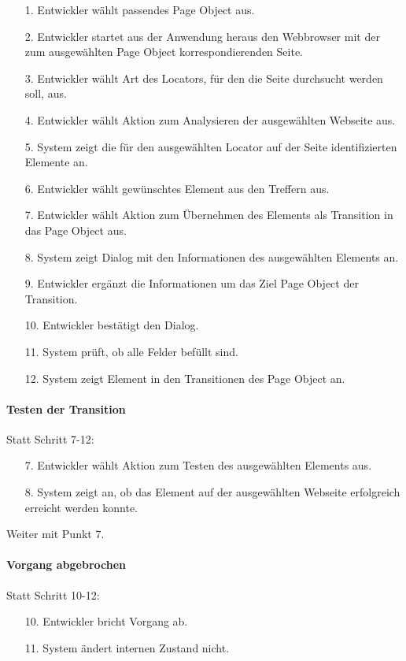\begin{itemize}[itemsep=0pt]
\item[1.] Entwickler wählt passendes Page Object aus.
\item[2.] Entwickler startet aus der Anwendung heraus den Webbrowser mit der zum ausgewählten Page Object korrespondierenden Seite. 
\item[3.] Entwickler wählt Art des Locators, für den die Seite durchsucht werden soll, aus.
\item[4.] Entwickler wählt Aktion zum Analysieren der ausgewählten Webseite aus.
\item[5.] System zeigt die für den ausgewählten Locator auf der Seite identifizierten Elemente an.
\item[6.] Entwickler wählt gewünschtes Element aus den Treffern aus. 
\item[7.] Entwickler wählt Aktion zum Übernehmen des Elements als Transition in das Page Object aus.
\item[8.] System zeigt Dialog mit den Informationen des ausgewählten Elements an.
\item[9.] Entwickler ergänzt die Informationen um das Ziel Page Object der Transition.
\item[10.] Entwickler bestätigt den Dialog.
\item[11.] System prüft, ob alle Felder befüllt sind.
\item[12.] System zeigt Element in den Transitionen des Page Object an.
\end{itemize}

\paragraph{Testen der Transition}
Statt Schritt 7-12:
\begin{itemize}
\item[7.] Entwickler wählt Aktion zum Testen des ausgewählten Elements aus. 
\item[8.] System zeigt an, ob das Element auf der ausgewählten Webseite erfolgreich erreicht werden konnte. 
\end{itemize}
Weiter mit Punkt 7.

\paragraph{Vorgang abgebrochen}
Statt Schritt 10-12:
\begin{itemize}[itemsep=0pt]
\item[10.] Entwickler bricht Vorgang ab. 
\item[11.] System ändert internen Zustand nicht. 
\end{itemize}

